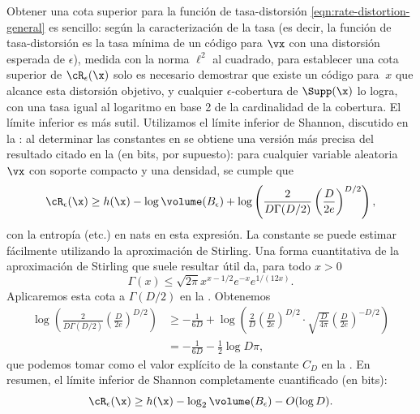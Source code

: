 \documentclass[../../book-main_es.tex]{subfiles}
\begin{document}
Obtener una cota superior para la función de tasa-distorsión
\eqref{eqn:rate-distortion-general} es sencillo: según la caracterización de la tasa
(es decir, la función de tasa-distorsión es la tasa mínima de
un código para $\vx$ con una distorsión esperada de $\epsilon$), medida con la norma $\ell^2$ al cuadrado, para establecer una cota superior
de $\cR_{\epsilon}(\x)$ solo es necesario demostrar que existe un código para $\ x$ que
alcance esta distorsión objetivo, y cualquier $\epsilon$-cobertura de $\Supp(\x)$
lo logra, con una tasa igual al logaritmo en base 2 de la cardinalidad de
la cobertura.
El límite inferior es más sutil. Utilizamos el límite inferior de Shannon,
discutido en la : al determinar las constantes en \cite[\S III,
(22)]{Linder1994-ej} se obtiene una versión más precisa del resultado citado en la
 (en bits, por supuesto): para cualquier variable aleatoria $\vx$ con soporte compacto
y una densidad, se cumple que
\begin{equation}\label{eq:slb-appendix-1}
    \cR_{\epsilon}(\x)
    \geq
    h(\x)
    - \log \volume(B_{\epsilon})
    +
    \log
    \left(
        \frac{
            2
        }
        {
            D \Gamma(D/2)
        }
        \left(
            \frac{
                D
            }
            {
                2e
            }
        \right)^{D/2}
    \right),
\end{equation}
con la entropía (etc.) en nats en esta expresión.
La constante se puede estimar fácilmente utilizando la aproximación de Stirling.
Una forma cuantitativa de la aproximación de Stirling que suele resultar útil da,
para todo $x > 0$ \cite{Jameson2015-hy}
\begin{equation}
    \Gamma(x) \leq \sqrt{2\pi} x^{x - 1/2} e^{-x} e^{1/(12x)}.
\end{equation}
Aplicaremos esta cota a $\Gamma(D/2)$ en la .
Obtenemos
\begin{align}
    \log
    \left(
        \frac{
            2
        }
        {
            D \Gamma(D/2)
        }
        \left(
            \frac{
                D
            }
            {
                2e
            }
        \right)^{D/2}
    \right)
    &\geq
    -\frac{1}{6D}
    +
    \log\left(
        \frac{2}{D}
        \left(
            \frac{
                D
            }
            {
                2e
            }
        \right)^{D/2}
        \cdot
        \sqrt{\frac{D}{4\pi}}
        \left(
            \frac{D}{2e}
        \right)^{-D/2}
    \right)
    \\
    &=
    -\frac{1}{6D}
    - \frac{1}{2}\log D\pi,\label{eq:slb-constant-est}
\end{align}
que podemos tomar como el valor explícito de la constante $C_D$ en la .
En resumen, el límite inferior de Shannon completamente cuantificado (en bits):
\begin{equation}\label{eq:slb-appendix}
    \cR_{\epsilon}(\x)
    \geq
    h(\x)
    - \log_2 \volume(B_{\epsilon})
    - O(\log D).
\end{equation}
\end{document}
